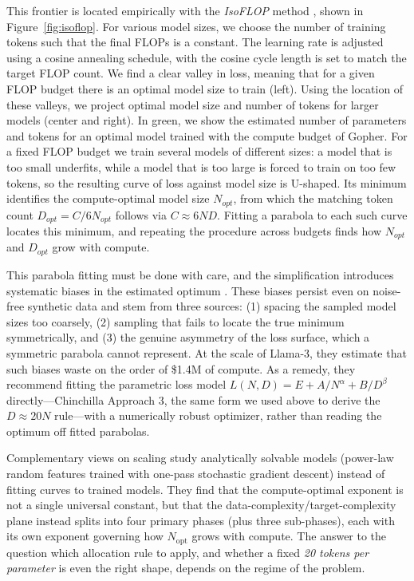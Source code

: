 This frontier is located empirically with the \emph{IsoFLOP} method \citep{10.5555/3600270.3602446}, shown in Figure~\ref{fig:isoflop}. For various model sizes, we choose the number of training tokens such that the final FLOPs is a constant. The learning rate is adjusted using a cosine annealing schedule, with the cosine cycle length is set to match the target FLOP count. We find a clear valley in loss, meaning that for a given FLOP budget there is an optimal model size to train (left). Using the location of these valleys, we project optimal model size and number of tokens for larger models (center and right). In green, we show the estimated number of parameters and tokens for an optimal model trained with the compute budget of Gopher. For a fixed FLOP budget we train several models of different sizes: a model that is too small underfits, while a model that is too large is forced to train on too few tokens, so the resulting curve of loss against model size is U-shaped. Its minimum identifies the compute-optimal model size $N_{opt}$, from which the matching token count $D_{opt} = C / 6N_{opt}$ follows via $C \approx 6ND$. Fitting a parabola to each such curve locates this minimum, and repeating the procedure across budgets finds how $N_{opt}$ and $D_{opt}$ grow with compute. 

This parabola fitting must be done with care, and the simplification introduces systematic biases in the estimated optimum \citep{czech2026problemschinchillaapproach2}. These biases persist even on noise-free synthetic data and stem from three sources: (1) spacing the sampled model sizes too coarsely, (2) sampling that fails to locate the true minimum symmetrically, and (3) the genuine asymmetry of the loss surface, which a symmetric parabola cannot represent. At the scale of Llama-3, they estimate that such biases waste on the order of \$1.4M of compute. As a remedy, they recommend fitting the parametric loss model $L(N,D) = E + A/N^{\alpha} + B/D^{\beta}$ directly---Chinchilla Approach 3, the same form we used above to derive the $D \approx 20N$ rule---with a numerically robust optimizer, rather than reading the optimum off fitted parabolas.

Complementary views on scaling \citep{paquette2024}  study analytically solvable models (power-law random features trained with one-pass stochastic gradient descent) instead of fitting curves to trained models. They find that the compute-optimal exponent is not a single universal constant, but that  the data-complexity/target-complexity plane instead splits into four primary phases (plus three sub-phases), each with its own exponent governing how $N_{\mbox{opt}}$ grows with compute.  The answer to the question which allocation rule to apply, and whether a fixed {\em 20 tokens per parameter} is even the right shape, depends on the  regime of the  problem.


